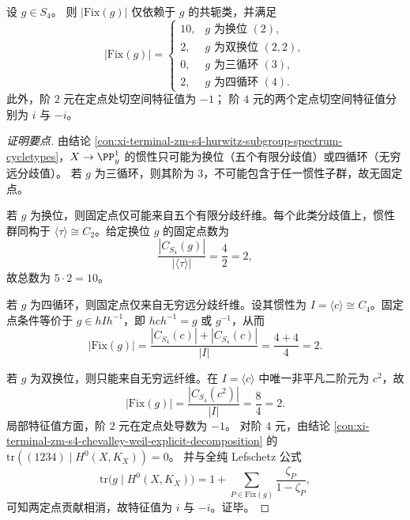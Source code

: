 \begin{conclusion}[\texorpdfstring{$S_4$}{S4} 作用在 \texorpdfstring{$X=\widetilde{X}$}{X} 上的固定点数完全表]\label{con:xi-terminal-zm-s4-conjugacy-fixedpoints-local-eigenvalue-full-count}
设 \(g\in S_4\)。
则 \(|\mathrm{Fix}(g)|\) 仅依赖于 \(g\) 的共轭类，并满足
\[
|\mathrm{Fix}(g)|=
\begin{cases}
10,& g\text{ 为换位 }(2),\\
2,& g\text{ 为双换位 }(2,2),\\
0,& g\text{ 为三循环 }(3),\\
2,& g\text{ 为四循环 }(4).
\end{cases}
\]
此外，阶 \(2\) 元在定点处切空间特征值为 \(-1\)；
阶 \(4\) 元的两个定点切空间特征值分别为 \(i\) 与 \(-i\)。
\end{conclusion}
\begin{proof}[证明要点]
由结论 \ref{con:xi-terminal-zm-s4-hurwitz-subgroup-spectrum-cycletypes}，\(X\to\PP^1_y\) 的惯性只可能为换位（五个有限分歧值）或四循环（无穷远分歧值）。
若 \(g\) 为三循环，则其阶为 \(3\)，不可能包含于任一惯性子群，故无固定点。

若 \(g\) 为换位，则固定点仅可能来自五个有限分歧纤维。每个此类分歧值上，惯性群同构于 \(\langle\tau\rangle\cong C_2\)。给定换位 \(g\) 的固定点数为
\[
\frac{|C_{S_4}(g)|}{|\langle\tau\rangle|}=\frac{4}{2}=2,
\]
故总数为 \(5\cdot2=10\)。

若 \(g\) 为四循环，则固定点仅来自无穷远分歧纤维。设其惯性为 \(I=\langle c\rangle\cong C_4\)。固定点条件等价于 \(g\in hIh^{-1}\)，即 \(hch^{-1}=g\) 或 \(g^{-1}\)，从而
\[
|\mathrm{Fix}(g)|=\frac{|C_{S_4}(c)|+|C_{S_4}(c)|}{|I|}=\frac{4+4}{4}=2.
\]

若 \(g\) 为双换位，则只能来自无穷远纤维。在 \(I=\langle c\rangle\) 中唯一非平凡二阶元为 \(c^2\)，故
\[
|\mathrm{Fix}(g)|=\frac{|C_{S_4}(c^2)|}{|I|}=\frac{8}{4}=2.
\]
局部特征值方面，阶 \(2\) 元在定点处导数为 \(-1\)。
对阶 \(4\) 元，由结论 \ref{con:xi-terminal-zm-s4-chevalley-weil-explicit-decomposition} 的
\(\mathrm{tr}((1234)\mid H^0(X,K_X))=0\)。
并与全纯 Lefschetz 公式
\[
\mathrm{tr}\!\bigl(g\mid H^0(X,K_X)\bigr)
=1+\sum_{P\in \mathrm{Fix}(g)}\frac{\zeta_P}{1-\zeta_P},
\]
可知两定点贡献相消，故特征值为 \(i\) 与 \(-i\)。证毕。
\end{proof}

